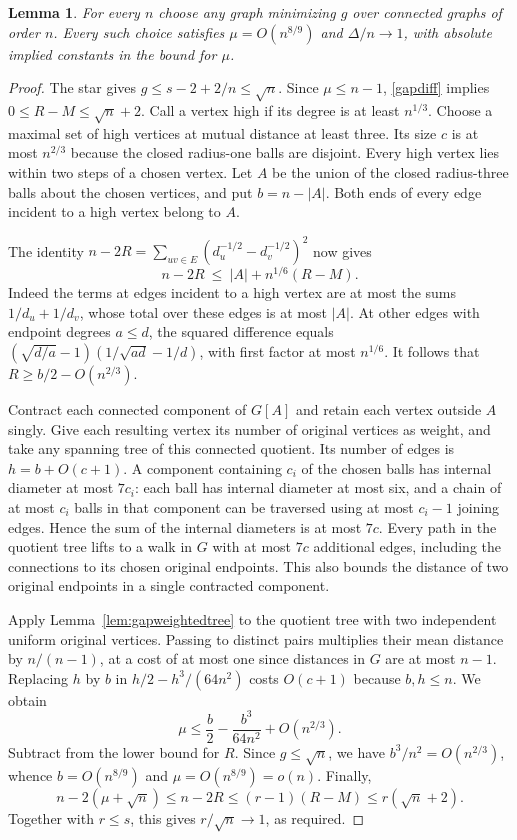 \documentclass[11pt,a4paper]{article}
\newtheorem{lemma}[theorem]{Lemma}
\theoremstyle{remark}\newtheorem*{remark}{Remark}
\begin{document}
\begin{lemma}\label{lem:gapstability}
For every $n$ choose any graph minimizing $g$ over connected graphs of order
$n$. Every such choice satisfies $\mu=O(n^{8/9})$ and
$\Delta/n\longrightarrow1$, with absolute implied constants in the
bound for $\mu$.
\end{lemma}
\begin{proof}
The star gives $g\le s-2+2/n\le\sqrt n$. Since $\mu\le n-1$,
\eqref{gapdiff} implies $0\le R-M\le \sqrt n+2$. Call a vertex high if its
degree is at least $n^{1/3}$. Choose a maximal set of high vertices at mutual
distance at least three. Its size $c$ is at most $n^{2/3}$ because the closed
radius-one balls are disjoint. Every high vertex lies within two steps of
a chosen vertex. Let $A$ be the union of the closed radius-three balls about
the chosen vertices, and put $b=n-|A|$. Both ends of every edge incident to
a high vertex belong to $A$.

The identity $n-2R=\sum_{uv\in E}(d_u^{-1/2}-d_v^{-1/2})^2$ now gives
\[
 n-2R\ \le\ |A|+n^{1/6}(R-M).
\]
Indeed the terms at edges incident to a high vertex are at most the sums
$1/d_u+1/d_v$, whose total over these edges is at most $|A|$.
At other edges with endpoint degrees $a\le d$, the squared difference equals
$(\sqrt{d/a}-1)(1/\sqrt{ad}-1/d)$, with first factor at most $n^{1/6}$.
It follows that $R\ge b/2-O(n^{2/3})$.

Contract each connected component of $G[A]$ and retain each vertex outside
$A$ singly.  Give each resulting vertex its number of original vertices
as weight, and take any spanning tree of this connected quotient. Its number
of edges is $h=b+O(c+1)$. A component containing $c_i$ of the chosen
balls has internal diameter at most $7c_i$: each ball has internal diameter
at most six, and a chain of at most $c_i$ balls in that component can be
traversed using at most $c_i-1$ joining edges. Hence the sum of the internal
diameters is at most $7c$. Every path in the quotient tree lifts to a walk
in $G$ with at most $7c$ additional edges, including the connections to its
chosen original endpoints. This also bounds the distance of two original
endpoints in a single contracted component.

Apply Lemma~\ref{lem:gapweightedtree} to the quotient tree with two independent
uniform original vertices. Passing to distinct pairs multiplies their mean
distance by $n/(n-1)$, at a cost of at most one since distances in $G$ are
at most $n-1$. Replacing $h$ by $b$ in $h/2-h^3/(64n^2)$ costs $O(c+1)$
because $b,h\le n$. We obtain
\[
 \mu\le \frac b2-\frac{b^3}{64n^2}+O(n^{2/3}).
\]
Subtract from the lower bound for $R$. Since $g\le\sqrt n$, we have
$b^3/n^2=O(n^{2/3})$, whence $b=O(n^{8/9})$ and
$\mu=O(n^{8/9})=o(n)$. Finally,
\[
 n-2(\mu+\sqrt n)\le n-2R\le(r-1)(R-M)
                                      \le r(\sqrt n+2).
\]
Together with $r\le s$, this gives $r/\sqrt n\to1$, as required.
\end{proof}
\end{document}
